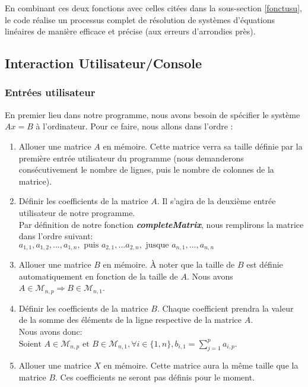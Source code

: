 En combinant ces deux fonctions avec celles citées dans la sous-section \ref{fonctusu}, le code réalise un processus complet de résolution de systèmes d'équations linéaires de manière efficace et précise (aux erreurs d'arrondies près).\\
\subsection{Interaction Utilisateur/Console}
\subsubsection{Entrées utilisateur}

En premier lieu dans notre programme, nous avons besoin de spécifier le système $Ax=B$ à l'ordinateur. 
Pour ce faire, nous allons dans l'ordre :
\begin{enumerate}
\item Allouer une matrice $A$ en mémoire. Cette matrice verra sa taille définie par la première entrée utilisateur du programme (nous demanderons consécutivement le nombre de lignes, puis le nombre de colonnes de la matrice).
\item Définir les coefficients de la matrice $A$. Il s'agira de la deuxième entrée utilisateur de notre programme. \\
Par définition de notre fonction \textit{\textbf{completeMatrix}}, nous remplirons la matrice dans l'ordre suivant:\\
$a_{1,1}, a_{1,2}, ..., a_{1,n}, \text{   puis   } a_{2,1}, ... a_{2,n}, \text{   jusque   }  a_{n,1}, ..., a_{n,n}$
\item Allouer une matrice $B$ en mémoire. À noter que la taille de $B$ est définie automatiquement en fonction de la taille de $A$. Nous avons $A\in \mathcal{M}_{n,p} \Rightarrow B\in \mathcal{M}_{n,1}$.
\item Définir les coefficients de la matrice $B$. Chaque coefficient prendra la valeur de la somme des éléments de la ligne respective de la matrice $A$.\\
Nous avons donc:\\ $ \text{Soient } A\in \mathcal{M}_{n,p} \text{ et } B\in \mathcal{M}_{n,1}  , \forall i \in \{1,n\}  , b_{i,1}=\sum_{j=1}^{p} a_{i,p}$.\\
\item Allouer une matrice $X$ en mémoire. Cette matrice aura la même taille que la matrice $B$. Ces coefficients ne seront pas définis pour le moment.
\end{enumerate}

